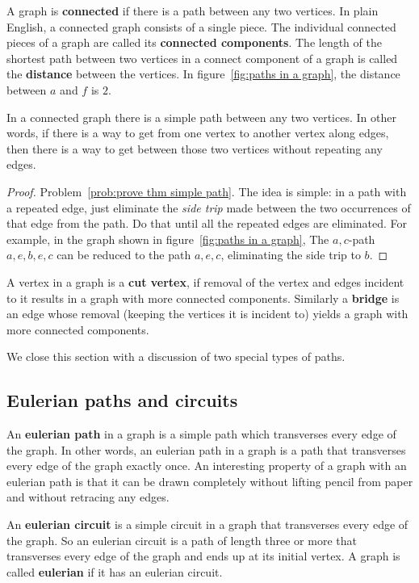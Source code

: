 A graph is {\bfseries {connected}} if there is a path between any two vertices. In plain English, a connected graph consists of a single piece. The individual connected pieces of a graph are called its {\bfseries connected components}. The length of the shortest path between two vertices in a connect component of a graph is called the {\bfseries distance} between the vertices.  In  figure~\ref{fig:paths in a graph},
the distance between $a$ and $f$ is $2$. 

\begin{thm}\label{thm:exists simple path}
 In a connected graph there is a simple path between
 any two vertices. In other words, if there is a way to get from one vertex to another vertex along edges, then there
 is a way to get between those two vertices without repeating any edges.
\end{thm}
\begin{proof}
Problem~\ref{prob:prove thm simple path}. The idea is simple: in a path with a repeated edge, just eliminate the {\it side trip} made between the two occurrences of that edge from the path. Do that until all the repeated edges are eliminated. For example,  in the graph shown in figure~\ref{fig:paths in a graph}, The $a,c${-}path $a,e,b,e,c$ can be reduced to the path $a,e,c$, eliminating the side trip to $b$.
\end{proof}


A vertex in a graph is a {\bfseries {cut vertex}}, if removal of the vertex and edges incident to it 
results in a graph with more connected components. Similarly a {\bfseries {bridge}} is an edge whose removal (keeping the vertices it is incident to) 
yields a graph with more connected components.

We close this section with a discussion of two special types of paths.

\subsection{Eulerian paths and circuits}

An {\bfseries {eulerian path}} in a graph is a simple path which transverses every edge of the graph. In other words, an eulerian path in a graph is a path that transverses every edge of the graph exactly once. 
An interesting property 
of a graph with an eulerian path is that it can be drawn completely
without lifting pencil from paper and without retracing any edges.

An {\bfseries {eulerian circuit}} is a simple circuit in a graph that transverses every edge of the graph. So an eulerian circuit  is a path of length three or more that transverses every edge of the graph and ends up at its initial vertex.
A graph is called {\bfseries eulerian} if it has an eulerian circuit.


